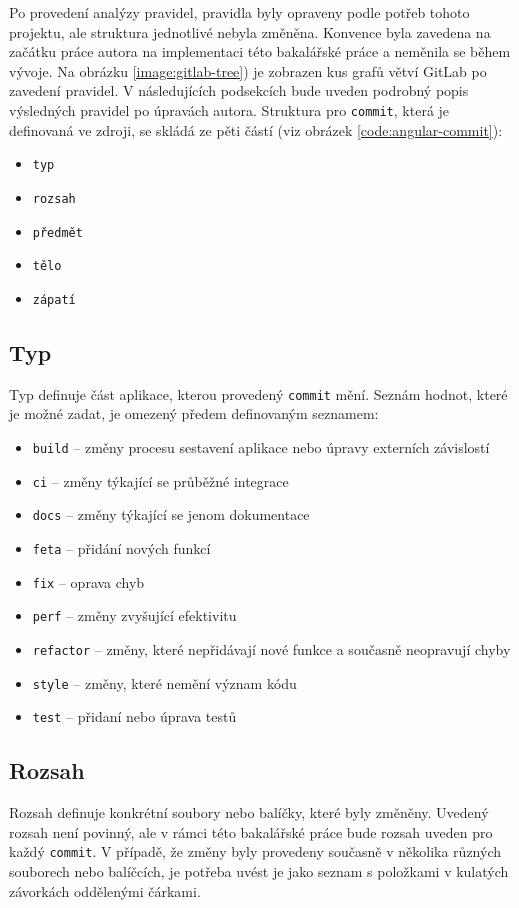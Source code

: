     Po provedení analýzy pravidel, pravidla byly opraveny podle potřeb tohoto projektu, ale struktura jednotlivé nebyla změněna. Konvence byla zavedena na začátku práce autora na implementaci této bakalářské práce a neměnila se během vývoje. Na obrázku \ref{image:gitlab-tree}) je zobrazen kus grafů větví GitLab po zavedení pravidel. V následujících podsekcích bude uveden podrobný popis výsledných pravidel po úpravách autora. Struktura pro \verb|commit|, která je definovaná ve zdroji, se skládá ze pěti částí (viz obrázek \ref{code:angular-commit}):
    \begin{itemize}
        \item \texttt{typ}
        \item \texttt{rozsah}
        \item \texttt{předmět}
        \item \texttt{tělo}
        \item \texttt{zápatí}
    \end{itemize}
    
    \subsection{Typ}
        Typ definuje část aplikace, kterou provedený \verb|commit| mění. Seznám hodnot, které je možné zadat, je omezený předem definovaným seznamem:
        \begin{itemize}
            \item \texttt{build} -- změny procesu sestavení aplikace nebo úpravy externích závislostí
            \item \texttt{ci} -- změny týkající se průběžné integrace
            \item \texttt{docs} -- změny týkající se jenom dokumentace
            \item \texttt{feta} -- přidání nových funkcí
            \item \texttt{fix} -- oprava chyb
            \item \texttt{perf} -- změny zvyšující efektivitu
            \item \texttt{refactor} -- změny, které nepřidávají nové funkce a současně neopravují chyby
            \item \texttt{style} -- změny, které nemění význam kódu
            \item \texttt{test} -- přidaní nebo úprava testů
        \end{itemize}
    
    \subsection{Rozsah}
        Rozsah definuje konkrétní soubory nebo balíčky, které byly změněny. Uvedený rozsah není povinný, ale v rámci této bakalářské práce bude rozsah uveden pro každý \verb|commit|. V případě, že změny byly provedeny současně v několika různých souborech nebo balíčcích, je potřeba uvést je jako seznam s položkami v kulatých závorkách oddělenými čárkami.
    
